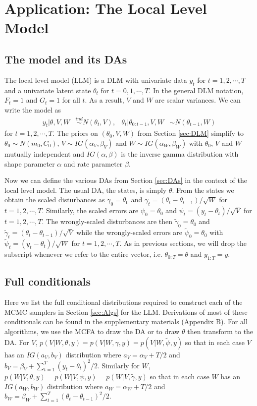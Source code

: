 \documentclass[12pt]{article}
\begin{document}
\section{Application: The Local Level Model}\label{sec:LLM}

\subsection{The model and its DAs}

The local level model (LLM) is a DLM with univariate data $y_t$ for $t=1,2,\cdots,T$ and a univariate latent state $\theta_t$ for $t=0,1,\cdots,T$. In the general DLM notation, $F_t=1$ and $G_t=1$ for all $t$. As a result, $V$ and $W$ are scalar variances. We can write the model as
\begin{align}
  y_t |\theta,V,W& \stackrel{ind}{\sim} N(\theta_t,V), &
  \theta_t |\theta_{0:t-1},V,W& \sim N(\theta_{t-1},W)
\end{align}
for $t=1,2,\cdots,T$. The priors on $(\theta_0,V,W)$ from Section \ref{sec:DLM} simplify to $\theta_0\sim N(m_0,C_0)$, $V\sim IG(\alpha_V,\beta_V)$ and $W\sim IG(\alpha_W,\beta_W)$ with $\theta_0$, $V$ and $W$ mutually independent and $IG(\alpha,\beta)$ is the inverse gamma distribution with shape parameter $\alpha$ and rate parameter $\beta$.

Now we can define the various DAs from Section \ref{sec:DAs} in the context of the local level model. The usual DA, the states, is simply $\theta$. From the states we obtain the scaled disturbances as $\gamma_0=\theta_0$ and $\gamma_t = (\theta_t - \theta_{t-1})/\sqrt{W}$ for $t=1,2,\cdots,T$. Similarly, the scaled errors are $\psi_0=\theta_0$ and $\psi_t = (y_t - \theta_t)/\sqrt{V}$ for $t=1,2,\cdots,T$. The wrongly-scaled disturbances are then $\tilde{\gamma}_{0}=\theta_0$ and $\tilde{\gamma}_t = (\theta_t - \theta_{t-1})/\sqrt{V}$ while the wrongly-scaled errors are $\tilde{\psi}_0=\theta_0$ with $\tilde{\psi}_t = (y_t - \theta_t)/\sqrt{W}$ for $t=1,2,\cdots,T$. As in previous sections, we will drop the subscript whenever we refer to the entire vector, i.e. $\theta_{0:T}=\theta$ and $y_{1:T}=y$.

\subsection{Full conditionals}\label{sec:LLM:fullcond}

Here we list the full conditional distributions required to construct each of the MCMC samplers in Section \ref{sec:Algs} for the LLM. Derivations of most of these conditionals can be found in the supplementary materials (Appendix B). For all algorithms, we use the MCFA to draw the DA or to draw $\theta$ then transform to the DA. For $V$, $p(V|W,\theta,y)=p(V|W,\gamma,y)=p(V|W,\tilde{\psi},y)$ so that in each case $V$ has an $IG(a_V,b_V)$ distribution where $a_V = \alpha_V + T/2$ and $b_V = \beta_V + \sum_{t=1}^T(y_t - \theta_t)^2/2$. Similarly for $W$, $p(W|V,\theta,y)=p(W|V,\psi,y)=p(W|V,\tilde{\gamma},y)$ so that in each case $W$ has an $IG(a_W, b_W)$ distribution where $a_W = \alpha_W + T/2$ and $b_W = \beta_W + \sum_{t=1}^T(\theta_t - \theta_{t-1})^2/2$.
\end{document}
